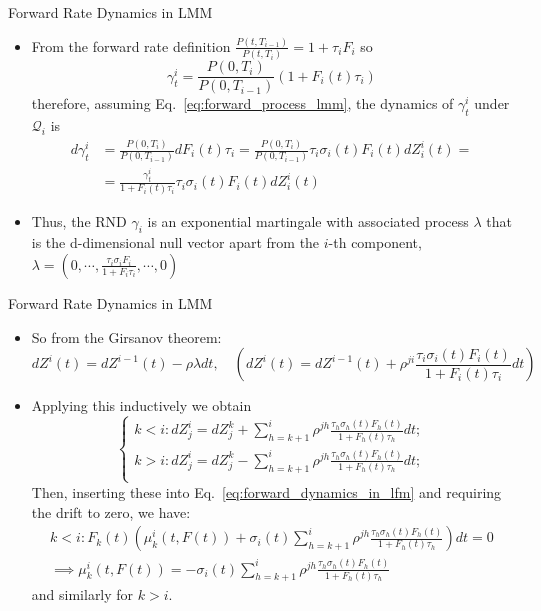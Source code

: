\documentclass{beamer}
\begin{document}
\begin{frame}{Forward Rate Dynamics in LMM}
	\begin{itemize}
		\item From the forward rate definition $\frac{P(t,T_{i-1})}{P(t,T_i)} = 1 + \tau_i F_i$ so
	\begin{equation*}
		\gamma^i_t = \frac{P(0, T_i)}{P(0, T_{i-1})}(1+F_i(t)\tau_i)
	\end{equation*}
	therefore, assuming Eq.~\ref{eq:forward_process_lmm}, the dynamics of $\gamma^i_t$ under $\mathcal{Q}_i$ is
	\begin{equation*}
		\begin{aligned}
		d\gamma^i_t &= \frac{P(0, T_i)}{P(0, T_{i-1})}dF_i(t)\tau_i = \frac{P(0, T_i)}{P(0, T_{i-1})}\tau_i\sigma_i(t)F_i(t)dZ^i_i(t) = \\ &= \frac{\gamma_t^i}{1+F_i(t)\tau_i}\tau_i\sigma_i(t)F_i(t)dZ^i_i(t)
		\end{aligned}
	\end{equation*}
	\item Thus, the RND $\gamma_i$ is an exponential martingale with associated process $\lambda$ that is the d-dimensional null vector apart from the $i$-th component, $\lambda = \left(0,\cdots,\frac{\tau_i\sigma_iF_i}{1+F_i\tau_i},\cdots, 0\right)$
\end{itemize}
\end{frame}

\begin{frame}{Forward Rate Dynamics in LMM}
	\begin{itemize}
	\item So from the Girsanov theorem:
	\begin{equation*}
		dZ^i(t) = dZ^{i-1}(t)-\rho\lambda dt,\quad \left(dZ^i(t) = dZ^{i-1}(t)+\rho^{ji}\frac{\tau_i\sigma_i(t)F_i(t)}{1+F_i(t)\tau_i} dt\right)
	\end{equation*}
	\item Applying this inductively we obtain
	\begin{equation*}
		\begin{cases}
			k < i : dZ^i_j = dZ^k_j + \sum_{h=k+1}^i \rho^{jh}\frac{\tau_h\sigma_h(t)F_h(t)}{1+F_h(t)\tau_h} dt;\\
			k > i : dZ^i_j = dZ^k_j - \sum_{h=k+1}^i \rho^{jh}\frac{\tau_h\sigma_h(t)F_h(t)}{1+F_h(t)\tau_h} dt;\\
		\end{cases}
	\end{equation*}
	Then, inserting these into Eq.~\ref{eq:forward_dynamics_in_lfm} and requiring the drift to zero, we have:
	\begin{equation*}
		\begin{gathered}
			k < i : F_k(t)\left( \mu_k^i(t, F(t)) + \sigma_i(t)\sum_{h=k+1}^i \rho^{jh} \frac{\tau_h\sigma_h(t)F_h(t)}{1+F_h(t)\tau_h}\right) dt = 0 \\
			\implies \mu_k^i(t, F(t)) = - \sigma_i(t)\sum_{h=k+1}^i \rho^{jh} \frac{\tau_h\sigma_h(t)F_h(t)}{1+F_h(t)\tau_h}
		\end{gathered}
	\end{equation*}
	and similarly for $k > i$.
	\end{itemize}
\end{frame}
\end{document}
